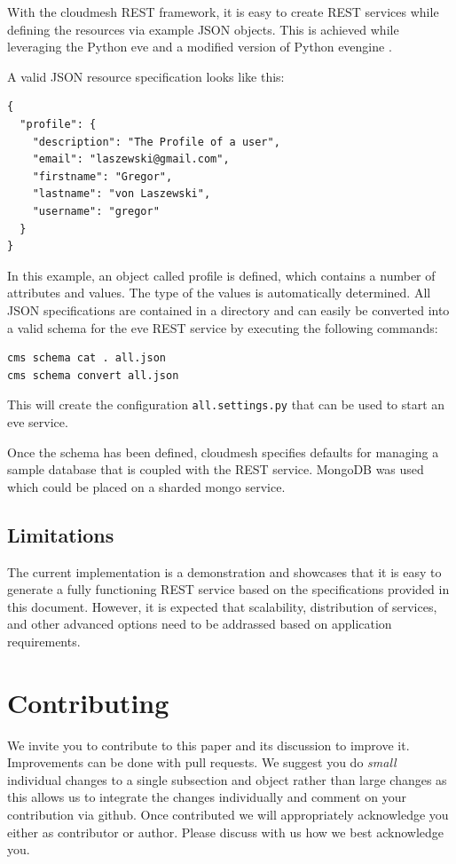 \documentclass[10pt]{article}
\begin{document}
With the cloudmesh REST framework, it is easy to create REST services
while defining the resources via example JSON objects. This is achieved
while leveraging the Python eve \cite{www-eve} and a modified version of Python
evengine \cite{www-cloudmesh-eveengine}. 

A valid JSON resource specification looks like this:

\begin{verbatim}
{
  "profile": {
    "description": "The Profile of a user",
    "email": "laszewski@gmail.com",
    "firstname": "Gregor",
    "lastname": "von Laszewski",
    "username": "gregor"
  }
}
\end{verbatim}

In this example, an object called profile is defined, which contains a number of
attributes and values. The type of the values is automatically
determined. All JSON specifications are contained in a directory and
can easily be converted into a valid schema for the eve REST service
by executing the following commands:

\begin{verbatim}
cms schema cat . all.json
cms schema convert all.json
\end{verbatim}

This will create the configuration \verb|all.settings.py| that can
be used to start an eve service.

Once the schema has been defined, cloudmesh specifies defaults for managing
a sample database that is coupled with the REST service. 
MongoDB was used which could be placed on a sharded mongo service. 

\subsection{Limitations}

The current implementation is a demonstration and showcases that it is
easy to generate a fully functioning REST service based on the
specifications provided in this document. However, it is expected that
scalability, distribution of services, and other advanced options
need to be addrassed based on application requirements.



\section{Contributing}

We invite you to contribute to this paper and its discussion to
improve it. Improvements can be done with pull requests. We suggest
you do {\em small} individual changes to a single subsection and
object rather than large changes as this allows us to integrate the
changes individually and comment on your contribution via github. Once
contributed we will appropriately acknowledge you either as
contributor or author. Please discuss with us how we best acknowledge
you.
\end{document}

